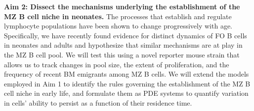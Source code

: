 \documentclass[11pt]{article} %
\begin{document}
\textbf{Aim 2: Dissect the mechanisms underlying the establishment of the MZ B cell niche in neonates.} 
The processes that establish and regulate lymphocyte populations have been shown to change progressively with age. %
Specifically, we have recently found evidence for distinct dynamics of FO B cells in neonates and adults and hypothesize that similar mechanisms are at play in the MZ B cell pool.
We will test this using a novel reporter mouse strain that allows us to track changes in pool size, the extent of proliferation, and the frequency of recent BM emigrants among MZ B cells.
We will extend the models employed in Aim 1 to identify the rules governing the establishment of the MZ B cell niche in early life, and formulate them as PDE systems to quantify variation in cells' ability to persist as a function of their residence time.
\end{document}
